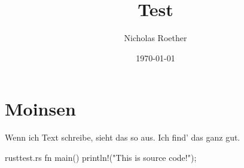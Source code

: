 \documentclass{fancy_article}
\title{Test}
\author{Nicholas Roether}
\date{\today}
\begin{document}
\maketitle

\newpage

\tableofcontents

\section{Moinsen}

Wenn ich Text schreibe, sieht das so aus. Ich find' das ganz gut.

\begin{codefile}{rust}{test.rs}
fn main() {
	println!("This is source code!");
}
\end{codefile}
\end{document}
